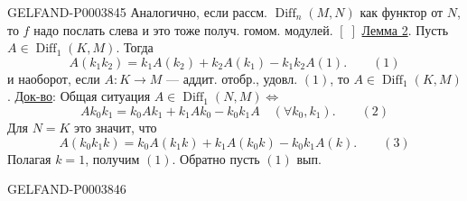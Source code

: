 \begin{GelfandAdjacentEvidence}{GELFAND-P000384}{5}
Аналогично, если рассм. $\operatorname{Diff}_n(M,N)$ как функтор от $N$, то $f$ надо послать слева и это тоже получ. гомом. модулей.
$[\;]$ \underline{Лемма 2}. Пусть $A\in\operatorname{Diff}_1(K,M)$. Тогда
\begin{equation*}A(k_1k_2)=k_1A(k_2)+k_2A(k_1)-k_1k_2A(1).\qquad(1)\end{equation*}
и наоборот, если $A:K\longrightarrow M$ --- аддит. отобр., удовл. $(1)$, то $A\in\operatorname{Diff}_1(K,M)$.
\underline{Док-во}: Общая ситуация $A\in\operatorname{Diff}_1(N,M)\Longleftrightarrow$
\begin{equation*}Ak_0k_1=k_0Ak_1+k_1Ak_0-k_0k_1A\quad(\forall k_0,k_1).\qquad(2)\end{equation*}
Для $N=K$ это значит, что
\begin{equation*}A(k_0k_1k)=k_0A(k_1k)+k_1A(k_0k)-k_0k_1A(k).\qquad(3)\end{equation*}
Полагая $k=1$, получим $(1)$. Обратно пусть $(1)$ вып.
\end{GelfandAdjacentEvidence}
\begin{GelfandAdjacentEvidence}{GELFAND-P000384}{6}




\end{GelfandAdjacentEvidence}
